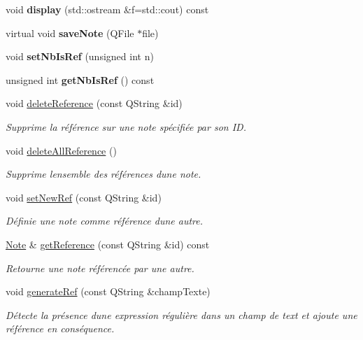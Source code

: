 \begin{DoxyCompactItemize}
\mbox{\label{class_note_a00684fea94bcdcf16f9d40a9d7a8dd5b}} 
void {\bfseries display} (std\+::ostream \&f=std\+::cout) const
\item 
\mbox{\label{class_note_a0c2cc72d7f3235c665a30ef915c5c58d}} 
virtual void {\bfseries save\+Note} (Q\+File $\ast$file)
\item 
\mbox{\label{class_note_acf0ffc4f88903851dce3abf75c3d53f2}} 
void {\bfseries set\+Nb\+Is\+Ref} (unsigned int n)
\item 
\mbox{\label{class_note_a1cb41601ca2dc7c020053c4c0b58f12e}} 
unsigned int {\bfseries get\+Nb\+Is\+Ref} () const
\item 
void \hyperlink{class_note_a91c86cf6ed18e4badb59a41e737a15fa}{delete\+Reference} (const Q\+String \&id)
\begin{DoxyCompactList}\small\item\em Supprime la référence sur une note spécifiée par son ID. \end{DoxyCompactList}\item 
void \hyperlink{class_note_aacbb89b120107a4b25dd16043908c693}{delete\+All\+Reference} ()
\begin{DoxyCompactList}\small\item\em Supprime l\textquotesingle{}ensemble des références d\textquotesingle{}une note. \end{DoxyCompactList}\item 
void \hyperlink{class_note_a3af2edc369310b9f122bd1fd6dbfa717}{set\+New\+Ref} (const Q\+String \&id)
\begin{DoxyCompactList}\small\item\em Définie une note comme référence d\textquotesingle{}une autre. \end{DoxyCompactList}\item 
\hyperlink{class_note}{Note} \& \hyperlink{class_note_a8e3ba6961f62a38f49b5fd209c083896}{get\+Reference} (const Q\+String \&id) const
\begin{DoxyCompactList}\small\item\em Retourne une note référencée par une autre. \end{DoxyCompactList}\item 
void \hyperlink{class_note_a5a0cb370ddd5a3da10fe8aa8a256d661}{generate\+Ref} (const Q\+String \&champ\+Texte)
\begin{DoxyCompactList}\small\item\em Détecte la présence d\textquotesingle{}une expression régulière dans un champ de text et ajoute une référence en conséquence. \end{DoxyCompactList}\end{DoxyCompactItemize}
